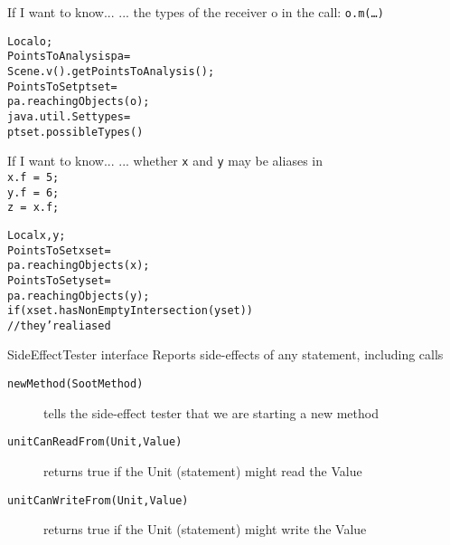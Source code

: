 \begin{slide}{If I want to know...}
... the types of the receiver o in the call: \texttt{o.m(\ldots)}\\
\hspace{10mm}
\begin{alltt}
Local o;
PointsToAnalysis pa =
     Scene.v().getPointsToAnalysis();
PointsToSet ptset = 
     pa.reachingObjects( o );
java.util.Set types =
     ptset.possibleTypes()
\end{alltt}
\end{slide}

\begin{slide}{If I want to know...}
... whether \texttt{x} and \texttt{y} may be aliases in\\
\texttt{x.f = 5;\\ y.f = 6;\\ z = x.f;}\\
\hspace{10mm}
\begin{alltt}
Local x, y;
PointsToSet xset =
    pa.reachingObjects( x );
PointsToSet yset =
    pa.reachingObjects( y );
if(xset.hasNonEmptyIntersection(yset))
    // they're aliased
\end{alltt}
\end{slide}

\begin{slide}{SideEffectTester interface}
Reports side-effects of any statement, including calls
\begin{description}
\item [\texttt{newMethod(SootMethod)}] tells the side-effect tester that
we are starting a new method
\item [\texttt{unitCanReadFrom(Unit,Value)}]
returns true if the Unit (statement) might read the Value
\item [\texttt{unitCanWriteFrom(Unit,Value)}]
returns true if the Unit (statement) might write the Value
\end{description}
\end{slide}

